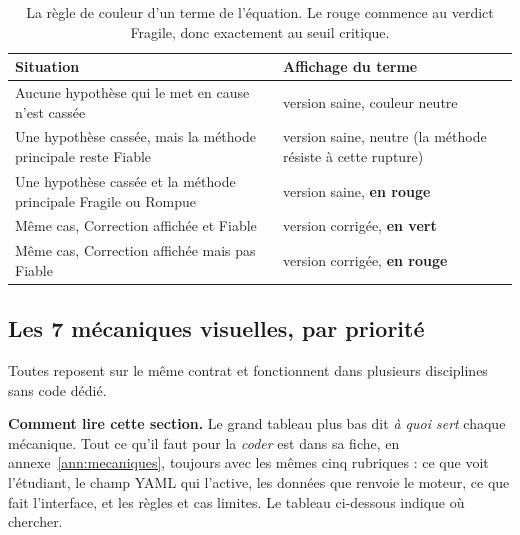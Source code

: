 \documentclass[11pt,a4paper]{article}
\begin{document}
\begin{table}[H]
  \centering
  \small
  \begin{tabularx}{\textwidth}{@{}Y L{6.2cm}@{}}
    \toprule
    \textbf{Situation} & \textbf{Affichage du terme} \\
    \midrule
    Aucune hypothèse qui le met en cause n'est cassée & version saine, couleur neutre \\
    Une hypothèse cassée, mais la méthode principale reste Fiable & version saine, neutre (la méthode résiste à cette rupture) \\
    Une hypothèse cassée et la méthode principale Fragile ou Rompue & version saine, \textcolor{ctBroken}{\textbf{en rouge}} \\
    Même cas, Correction affichée et Fiable & version corrigée, \textcolor{ctCorrection}{\textbf{en vert}} \\
    Même cas, Correction affichée mais pas Fiable & version corrigée, \textcolor{ctBroken}{\textbf{en rouge}} \\
    \bottomrule
  \end{tabularx}
  \caption{La règle de couleur d'un terme de l'équation. Le rouge commence au verdict Fragile, donc exactement au seuil critique.}
\end{table}

\subsection{Les 7 mécaniques visuelles, par priorité}\label{sec:mecaniques}
Toutes reposent sur le même contrat et fonctionnent dans plusieurs disciplines sans code dédié.

\textbf{Comment lire cette section.} Le grand tableau plus bas dit \emph{à quoi sert} chaque mécanique. Tout ce qu'il faut pour la \emph{coder} est dans sa fiche, en annexe~\ref{ann:mecaniques}, toujours avec les mêmes cinq rubriques : ce que voit l'étudiant, le champ YAML qui l'active, les données que renvoie le moteur, ce que fait l'interface, et les règles et cas limites. Le tableau ci-dessous indique où chercher.
\end{document}
